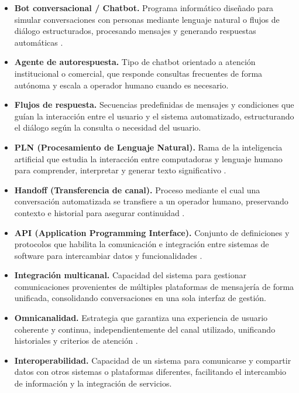 \begin{itemize}
    \item \textbf{Bot conversacional / Chatbot.} Programa informático diseñado para simular conversaciones con personas mediante lenguaje natural o flujos de diálogo estructurados, procesando mensajes y generando respuestas automáticas \parencite{adamopoulou2020}.

    \item \textbf{Agente de autorespuesta.} Tipo de chatbot orientado a atención institucional o comercial, que responde consultas frecuentes de forma autónoma y escala a operador humano cuando es necesario.

    \item \textbf{Flujos de respuesta.} Secuencias predefinidas de mensajes y condiciones que guían la interacción entre el usuario y el sistema automatizado, estructurando el diálogo según la consulta o necesidad del usuario.

    \item \textbf{PLN (Procesamiento de Lenguaje Natural).} Rama de la inteligencia artificial que estudia la interacción entre computadoras y lenguaje humano para comprender, interpretar y generar texto significativo \parencite{manningschutze1999}.

    \item \textbf{Handoff (Transferencia de canal).} Proceso mediante el cual una conversación automatizada se transfiere a un operador humano, preservando contexto e historial para asegurar continuidad \parencite{folstadskjuve2019}.

    \item \textbf{API (Application Programming Interface).} Conjunto de definiciones y protocolos que habilita la comunicación e integración entre sistemas de software para intercambiar datos y funcionalidades \parencite{fielding2000}.

    \item \textbf{Integración multicanal.} Capacidad del sistema para gestionar comunicaciones provenientes de múltiples plataformas de mensajería de forma unificada, consolidando conversaciones en una sola interfaz de gestión.

    \item \textbf{Omnicanalidad.} Estrategia que garantiza una experiencia de usuario coherente y continua, independientemente del canal utilizado, unificando historiales y criterios de atención \parencite{rigby2011}.

    \item \textbf{Interoperabilidad.} Capacidad de un sistema para comunicarse y compartir datos con otros sistemas o plataformas diferentes, facilitando el intercambio de información y la integración de servicios.


\end{itemize}
